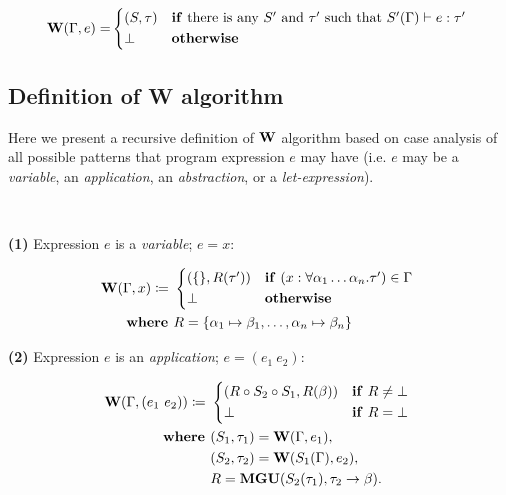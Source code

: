 \documentclass[a4paper,oneside]{memoir}
\begin{document}
\begin{align*}
\W(\Gamma, e) = &
\begin{cases*}
  (S, \tau) 
  & \textbf{if} there is any $\SPr$ and $\tauPr$ such that $S^\prime(\Gamma) \vdash e : \tauPr$  \\
  \bot & \textbf{otherwise}
\end{cases*}\\
\end{align*}




\subsection{Definition of W algorithm}

Here we present a recursive definition of $\operatorname{\textbf{W}}$ algorithm based on case analysis of all possible patterns that program expression $e$ may have 
(i.e. $e$ may be a \textit{variable}, an \textit{application}, an \textit{abstraction}, or a \textit{let-expression}). 

~

\textbf{(1)} Expression $e$ is a \textit{variable}; $e = x$:

\begin{align*}
\W(\Gamma, x) \defi ~ &
\begin{cases*}
  (\{\}, R(\tauPr) ) 
  & \textbf{if} $(x : \forall \alpha_1 \dots \alpha_n.\tauPr) \in \Gamma$  \\
  \bot & \textbf{otherwise}
\end{cases*}\\
\where & R = \{\alpha_1 \mapsto \beta_1, \dots, \alpha_n \mapsto \beta_n\} \\
\end{align*}


\textbf{(2)} Expression $e$ is an \textit{application}; $e = (e_1~e_2)$:

\begin{align*}
\W(\Gamma, (e_1~e_2)) \defi ~ & 
\begin{cases*}
  (R \circ S_2 \circ S_1, R(\beta) ) & \textbf{if} $R \neq \bot$ \\
  \bot & \textbf{if} $R = \bot$
\end{cases*}\\
\where & (S_1, \tau_1) = \W(\Gamma, e_1), \\
       & (S_2, \tau_2) = \W(S_1(\Gamma), e_2), \\
       & R = \Mgu( S_2(\tau_1), \tau_2 \ar \beta ).\\
\end{align*}
\end{document}
